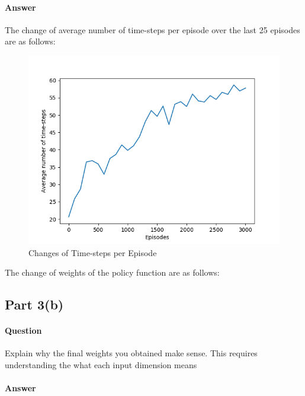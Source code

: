 \documentclass[11pt,twoside]{article}
\begin{document}
\paragraph{Answer}
The change of average number of time-steps per episode over the last 25 episodes are as follows:
\begin{figure}[h]
	\centering
	\includegraphics[scale=1]{part3a.png}
	\caption*{Changes of Time-steps per Episode}
\end{figure}

The change of weights of the policy function are as follows:
\begingroup
\obeylines
%
\endgroup%
\subsection*{Part 3(b)}
\paragraph{Question}
Explain why the final weights you obtained make sense. This requires understanding the what each input dimension means

\paragraph{Answer}

\clearpage
\end{document}
